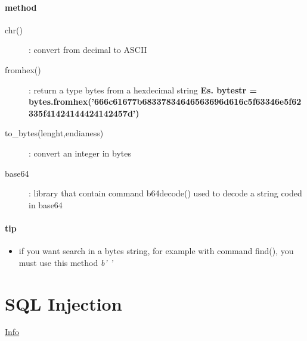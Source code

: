 \documentclass{article}
\begin{document}
                                                \paragraph{method}
                                                        \begin{description}
                                                            \item[chr()] : convert from decimal to ASCII 
                                                            \item[fromhex()]: return a type bytes from a hexdecimal string \textbf{Es. bytestr = bytes.fromhex('666c61677b68337834646563696d616c5f63346e5f62335f41424144424142457d')
                                                            }  
                                                            \item [to\_bytes(lenght,endianess)]: convert an integer in bytes
                                                            \item [base64]: library that contain command b64decode() used to decode a string coded in base64
                                                        \end{description}
                                                \paragraph{tip}
                                                        \begin{itemize}
                                                            \item if you want search in a  bytes string, for example with command find(), you must use this method \textit{b' '}
                                                        \end{itemize}
        \section{SQL Injection} 
                            \href{http://web-17.challs.olicyber.it/}{Info}
                                            

                    
                                
\end{document}
